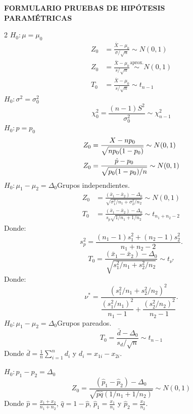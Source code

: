 \documentclass[letterpaper,9pt]{extarticle}
\begin{document}
\begin{center}\large\bfseries FORMULARIO PRUEBAS DE HIPÓTESIS\\PARAMÉTRICAS\end{center}
\vspace{-0.3cm}
\begin{multicols}{2}
\raggedcolumns
\textbf{$H_0:\mu=\mu_0$}
\begin{align}
Z_0&=\frac{\bar X-\mu_0}{\sigma/\sqrt n}\sim N(0,1)\\
Z_0&=\frac{\bar X-\mu_0}{s/\sqrt n}\overset{\mathrm{aprox.}}\sim N(0,1)\\
T_0&=\frac{\bar X-\mu_0}{s/\sqrt n}\sim t_{n-1}
\end{align}
\textbf{$H_0:\sigma^2=\sigma_0^2$}
\begin{equation}\chi_0^2=\frac{(n-1)S^2}{\sigma_0^2}\sim\chi^2_{n-1}\end{equation}
\textbf{$H_0:p=p_0$}
\begin{align}
Z_0&=\frac{X-np_0}{\sqrt{np_0(1-p_0)}}\sim N(0,1)\\
Z_0&=\frac{\hat p-p_0}{\sqrt{p_0(1-p_0)/n}}\sim N(0,1)\notag
\end{align}
\textbf{$H_0:\mu_1-\mu_2=\Delta_0$}\quad Grupos independientes.
\begin{align}
Z_0&=\frac{(\bar x_1-\bar x_2)-\Delta_0}{\sqrt{\sigma_1^2/n_1+\sigma_2^2/n_2}}\sim N(0,1)\\
T_0&=\frac{(\bar x_1-\bar x_2)-\Delta_0}{s_p\sqrt{1/n_1+1/n_2}}\sim t_{n_1+n_2-2}
\end{align}
Donde:
\[s_p^2=\frac{(n_1-1)s_1^2+(n_2-1)s_2^2}{n_1+n_2-2}.\]
\begin{equation}
T_0=\frac{(\bar x_1-\bar x_2)-\Delta_0}{\sqrt{s_1^2/n_1+s_2^2/n_2}}\sim t_{\nu^*}
\end{equation}
Donde:
\[\nu^*=\frac{(s_1^2/n_1+s_2^2/n_2)^2}{\dfrac{(s_1^2/n_1)^2}{n_1-1}+\dfrac{(s_2^2/n_2)^2}{n_2-1}}.\]
\textbf{$H_0:\mu_1-\mu_2=\Delta_0$}\quad Grupos pareados.
\begin{equation}
T_0=\frac{\bar d-\Delta_0}{s_d/\sqrt n}\sim t_{n-1}
\end{equation}
Donde $\bar d=\frac1n\sum_{i=1}^n d_i$ y $d_i=x_{1i}-x_{2i}$.

\columnbreak
\textbf{$H_0:p_1-p_2=\Delta_0$}
\begin{equation}
Z_0=\frac{(\hat p_1-\hat p_2)-\Delta_0}{\sqrt{\hat p\hat q(1/n_1+1/n_2)}}\sim N(0,1)
\end{equation}
Donde $\hat p=\frac{x_1+x_2}{n_1+n_2}$, $\hat q=1-\hat p$, $\hat p_1=\frac{x_1}{n_1}$ y $\hat p_2=\frac{x_2}{n_2}$.


\end{multicols}
\end{document}
